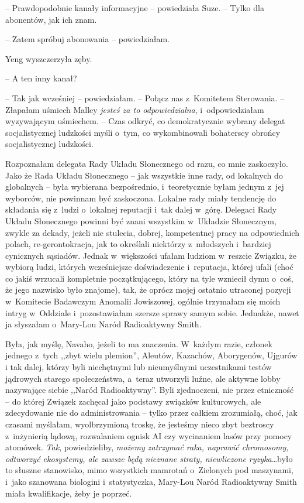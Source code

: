\documentclass[oneside,polish,11pt,sfheadings]{mwbk}
\begin{document}
-- Prawdopodobnie kanały informacyjne -- powiedziała Suze. -- Tylko dla
abonentów, jak ich znam.

-- Zatem spróbuj abonowania -- powiedziałam.

Yeng wyszczerzyła zęby. 

-- A ten inny kanał?

-- Tak jak wcześniej -- powiedziałam. -- Połącz nas z~Komitetem Sterowania.
-- Złapałam uśmiech Malley \textit{jesteś za to odpowiedzialna}, i~odpowiedziałam wyzywającym uśmiechem. -- Czas odkryć, co demokratycznie
wybrany delegat socjalistycznej ludzkości myśli o~tym, co wykombinowali
bohaterscy obrońcy socjalistycznej ludzkości.

Rozpoznałam delegata Rady Układu Słonecznego od razu, co mnie
zaskoczyło. Jako że Rada Układu Słonecznego -- jak wszystkie inne rady,
od lokalnych do globalnych -- była wybierana bezpośrednio, i~teoretycznie
byłam jednym z~jej wyborców, nie powinnam być zaskoczona. Lokalne rady
miały tendencję do składania się z~ludzi o~lokalnej reputacji i~tak
dalej w~górę. Delegaci Rady Układu Słonecznego powinni być znani
wszystkim w~Układzie Słonecznym, zwykle za dekady, jeżeli nie stulecia,
dobrej, kompetentnej pracy na odpowiednich polach, re-gerontokracja, jak
to określali niektórzy z~młodszych i~bardziej cynicznych sąsiadów.
Jednak w~większości ufałam ludziom w~reszcie Związku, że wybiorą ludzi,
których wcześniejsze doświadczenie i~reputacja, której ufali (choć co
jakiś wrzucali kompletnie początkującego, który na tyle wzniecił dymu o~coś, że jego nazwisko było znajome), tak, że oprócz mojej ostatnio
utraconej pozycji w~Komitecie Badawczym Anomalii Jowiszowej, ogólnie
trzymałam się moich intryg w~Oddziale i~pozostawiałam szersze sprawy
samym sobie. Jednakże, nawet ja słyszałam o~Mary-Lou Naród Radioaktywny
Smith.

Była, jak myślę, Navaho, jeżeli to ma znaczenia. W~każdym razie, członek
jednego z~tych ,,zbyt wielu plemion'', Aleutów, Kazachów, Aborygenów,
Ujgurów i tak dalej, którzy byli niechętnymi lub nieumyślnymi uczestnikami
testów jądrowych starego społeczeństwa, a~teraz utworzyli luźne, ale
aktywne lobby nazywające siebie ,,Naród Radioaktywny''. Byli
zjednoczeni, nie przez etniczność -- do której Związek zachęcał jako
podstawy związków kulturowych, ale zdecydowanie nie do administrowania -- tylko przez całkiem zrozumiałą, choć, jak czasami myślałam,
wyolbrzymioną troskę, że jesteśmy nieco zbyt beztroscy z~inżynierią
lądową, rozwalaniem ognisk AI czy wycinaniem lasów przy pomocy atomówek.
\textit{Tak}, powiedzieliby, \textit{możemy zatrzymać raka, naprawić
chromosomy, odtworzyć ekosystemy, ale zawsze będą nieznane straty,
niewliczone ryzyka}\ldots  było to słuszne stanowisko, mimo wszystkich
mamrotań o~Zielonych pod maszynami, i~jako szanowana biologini i~statystyczka, Mary-Lou Naród Radioaktywny Smith miała kwalifikacje, żeby
je poprzeć.
\end{document}

